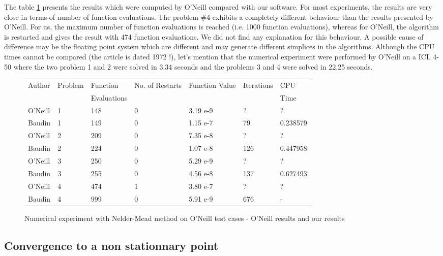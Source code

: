 The table \ref{fig-nm-oneill-table} presents the results which were 
computed by O'Neill compared with our software.
For most experiments, the results are very close in terms of 
number of function evaluations. 
The problem \#4 exhibits a completely different behaviour than the 
results presented by O'Neill. For us, the maximum number of function evaluations
is reached (i.e. 1000 function evaluations), whereas for O'Neill, the algorithm 
is restarted and gives the result with 474 function evaluations. 
We did not find any explanation for this behaviour. A possible cause of 
difference may be the floating point system which are different and may 
generate different simplices in the algorithms.
Although the CPU times cannot be 
compared (the article is dated 1972 !), let's mention 
that the numerical experiment were performed by O'Neill
on a ICL 4-50 where the two problem 1 and 2 were solved in 3.34 seconds
and the problems 3 and 4 were solved in 22.25 seconds.


\begin{figure}[htbp]
\begin{center}
\begin{tiny}
\begin{tabular}{|l|l|l|l|l|l|l|}
\hline
Author & Problem & Function & No. of Restarts & Function Value & Iterations & CPU\\
& & Evaluations & & & & Time \\
\hline
O'Neill & 1 & 148 & 0 & 3.19 e-9 & ? & ? \\
Baudin & 1 & 149 & 0 & 1.15 e-7 & 79 & 0.238579 \\
\hline
O'Neill & 2 & 209 & 0 & 7.35 e-8 & ? & ?  \\
Baudin & 2 & 224 & 0 & 1.07 e-8 & 126 & 0.447958 \\
\hline
O'Neill & 3 & 250 & 0 & 5.29 e-9 & ? & ? \\
Baudin & 3 & 255 & 0 & 4.56 e-8 & 137 & 0.627493 \\
\hline
O'Neill & 4 & 474 & 1 & 3.80 e-7 & ? & ? \\
Baudin & 4 & 999 & 0 & 5.91 e-9 & 676 & - \\
\hline
\end{tabular}
\end{tiny}
\end{center}
\caption{Numerical experiment with Nelder-Mead method on O'Neill test cases - O'Neill results and our results}
\label{fig-nm-oneill-table}
\end{figure}

\subsection{Convergence to a non stationnary point}

